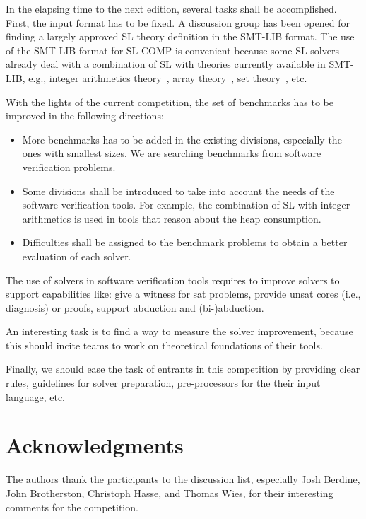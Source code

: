 \documentclass{llncs}
\begin{document}
In the elapsing time to the next edition, several tasks shall be accomplished.
First, the input format has to be fixed.
A discussion group has been opened for finding a largely approved SL theory definition in the SMT-LIB format.
The use of the SMT-LIB format for SL-COMP is convenient because some SL solvers already deal with a combination of SL with theories currently available in SMT-LIB, e.g., 
integer arithmetics theory~\cite{PerezR11}, array theory~\cite{BouajjaniDES12-vmcai}, set theory~\cite{PiskacWZ13}, etc.


With the lights of the current competition, the set of benchmarks has to be improved in the following directions:
\begin{itemize}
\item More benchmarks has to be added in the existing divisions, especially the ones with smallest sizes. 
We are searching benchmarks from software verification problems.

\item Some divisions shall be introduced to take into account the needs of the software verification tools. For example, the combination of SL with integer arithmetics is used in tools that reason about the heap consumption.

\item Difficulties shall be assigned to the benchmark problems to obtain a better evaluation of each solver.
\end{itemize}

The use of solvers in software verification tools requires to improve solvers to support capabilities like:
give a witness for sat problems,
provide unsat cores (i.e., diagnosis) or proofs,
support abduction and (bi-)abduction.

An interesting task is to find a way to measure the solver improvement, because this should incite teams to work on theoretical foundations of their tools.
% 

Finally, we should ease the task of entrants in this competition by providing clear rules, guidelines for solver preparation, pre-processors for the their input language, etc.



\section*{Acknowledgments}

The authors thank the participants to the discussion list, especially 
Josh Berdine, John Brotherston, Christoph Hasse, and Thomas Wies, 
for their interesting comments for the competition.





\end{document}
